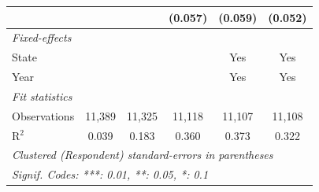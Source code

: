 \begin{tabular}{lccccc}
                            &                &                & (0.057)        & (0.059)        & (0.052)\\   
   \midrule
   \emph{Fixed-effects}\\
   State                    &                &                &                & Yes            & Yes\\  
   Year                     &                &                &                & Yes            & Yes\\  
   \midrule
   \emph{Fit statistics}\\
   Observations             & 11,389         & 11,325         & 11,118         & 11,107         & 11,108\\  
   R$^2$                    & 0.039          & 0.183          & 0.360          & 0.373          & 0.322\\  
   \midrule \midrule
   \multicolumn{6}{l}{\emph{Clustered (Respondent) standard-errors in parentheses}}\\
   \multicolumn{6}{l}{\emph{Signif. Codes: ***: 0.01, **: 0.05, *: 0.1}}\\
\end{tabular}
\par\endgroup


